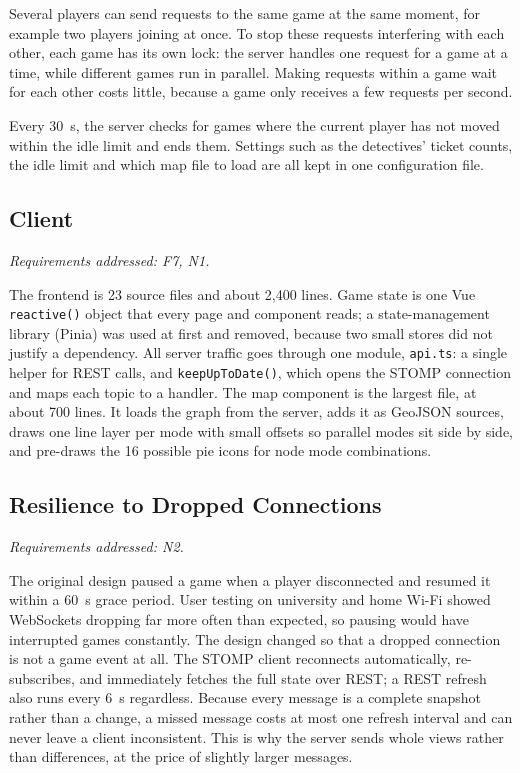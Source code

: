 \documentclass[lettersize,journal]{IEEEtran}
\newcommand{\reqs}[1]{\noindent\textit{Requirements addressed: #1.}\par\smallskip}
\begin{document}
Several players can send requests to the same game at the same moment, for example two players joining at once. To stop these requests interfering with each other, each game has its own lock: the server handles one request for a game at a time, while different games run in parallel. Making requests within a game wait for each other costs little, because a game only receives a few requests per second.

Every 30~s, the server checks for games where the current player has not moved within the idle limit and ends them. Settings such as the detectives' ticket counts, the idle limit and which map file to load are all kept in one configuration file.

\subsection{Client}\label{sec:client}
\reqs{F7, N1}
The frontend is 23 source files and about 2,400 lines. Game state is one Vue \texttt{reactive()} object that every page and component reads; a state-management library (Pinia) was used at first and removed, because two small stores did not justify a dependency. All server traffic goes through one module, \texttt{api.ts}: a single helper for REST calls, and \texttt{keepUpToDate()}, which opens the STOMP connection and maps each topic to a handler. The map component is the largest file, at about 700 lines. It loads the graph from the server, adds it as GeoJSON sources, draws one line layer per mode with small offsets so parallel modes sit side by side, and pre-draws the 16 possible pie icons for node mode combinations.

\subsection{Resilience to Dropped Connections}\label{sec:resilience}
\reqs{N2}
The original design paused a game when a player disconnected and resumed it within a 60~s grace period. User testing on university and home Wi-Fi showed WebSockets dropping far more often than expected, so pausing would have interrupted games constantly. The design changed so that a dropped connection is not a game event at all. The STOMP client reconnects automatically, re-subscribes, and immediately fetches the full state over REST; a REST refresh also runs every 6~s regardless. Because every message is a complete snapshot rather than a change, a missed message costs at most one refresh interval and can never leave a client inconsistent. This is why the server sends whole views rather than differences, at the price of slightly larger messages.
\end{document}
